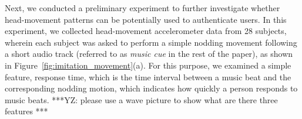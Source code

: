 Next, we conducted a preliminary experiment to further investigate whether head-movement patterns can be potentially used to authenticate users. In this experiment, we collected head-movement accelerometer data from 28 subjects, wherein each subject was asked to perform a simple nodding movement following a short audio track (referred to as \emph{music cue} in the rest of the paper), as shown in Figure~\ref{fig:imitation_movement}(a).   For this purpose, we examined %
 a simple feature, response time, which is the time interval between a music beat and the corresponding nodding motion, which indicates how quickly a person responds to music beats. ***YZ: please use a wave picture to show what are there three features ***
